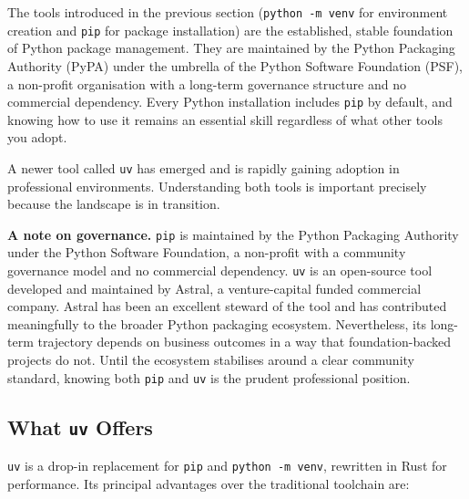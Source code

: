 The tools introduced in the previous section (\texttt{python -m venv}
for environment creation and \texttt{pip} for package
installation) are the established, stable foundation of Python package
management. They are maintained by the Python Packaging Authority
(PyPA) under the umbrella of the Python Software Foundation (PSF), a
non-profit organisation with a long-term governance structure and no
commercial dependency. Every Python installation includes \texttt{pip}
by default, and knowing how to use it remains an essential skill
regardless of what other tools you adopt.

A newer tool called \texttt{uv} has emerged and is rapidly gaining
adoption in professional environments. Understanding both tools is
important precisely because the landscape is in transition.

\begin{infobox}
\textbf{A note on governance.} \texttt{pip} is maintained by the
Python Packaging Authority under the Python Software Foundation, a
non-profit with a community governance model and no commercial
dependency. \texttt{uv} is an open-source tool developed and
maintained by Astral, a venture-capital funded commercial company.
Astral has been an excellent steward of the tool and has contributed
meaningfully to the broader Python packaging ecosystem. Nevertheless,
its long-term trajectory depends on business outcomes in a way that
foundation-backed projects do not. Until the ecosystem stabilises
around a clear community standard, knowing both \texttt{pip} and
\texttt{uv} is the prudent professional position.
\end{infobox}

\subsection{What \texttt{uv} Offers}

\texttt{uv} is a drop-in replacement for \texttt{pip} and
\texttt{python -m venv}, rewritten in Rust for performance. Its
principal advantages over the traditional toolchain are:


